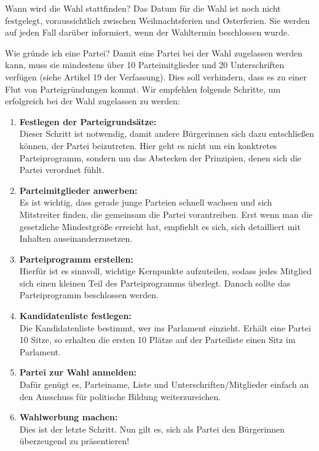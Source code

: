 \documentclass{sasbase}
\begin{document}
\begin{question}{Wann wird die Wahl stattfinden?}
	Das Datum f\"{u}r die Wahl ist noch nicht festgelegt, voraussichtlich zwischen Weihnachtsferien und Osterferien. Sie werden auf jeden Fall dar\"{u}ber informiert, wenn der Wahltermin beschlossen wurde.
\end{question}
\begin{question}{Wie gr\"{u}nde ich eine Partei?}
	Damit eine Partei bei der Wahl zugelassen werden kann, muss sie mindestens \"{u}ber 10 Parteimitglieder und 20 Unterschriften verf\"{u}gen (siehe Artikel 19 der Verfassung). Dies soll verhindern, dass es zu einer Flut von Parteigr\"{u}ndungen kommt. Wir empfehlen folgende Schritte, um erfolgreich bei der Wahl zugelassen zu werden:
	\begin{enumerate}
		\item \textbf{Festlegen der Parteigrunds\"{a}tze:}\\ Dieser Schritt ist notwendig, damit andere B\"{u}rgerinnen sich dazu entschlie{\ss}en k\"{o}nnen, der Partei beizutreten. Hier geht es nicht um ein konktretes Parteiprogramm, sondern um das Abstecken der Prinzipien, denen sich die Partei verordnet f\"{u}hlt.
		\item \textbf{Parteimitglieder anwerben:}\\ Es ist wichtig, dass gerade junge Parteien schnell wachsen und sich Mitstreiter finden, die gemeinsam die Partei vorantreiben. Erst wenn man die gesetzliche Mindestgr\"{o}{\ss}e erreicht hat, empfiehlt es sich, sich detailliert mit Inhalten auseinanderzusetzen.
		\item \textbf{Parteiprogramm erstellen:}\\ Hierf\"{u}r ist es sinnvoll, wichtige Kernpunkte aufzuteilen, sodass jedes Mitglied sich einen kleinen Teil des Parteiprogramms \"{u}berlegt. Danach sollte das Parteiprogramm beschlossen werden.
		\item \textbf{Kandidatenliste festlegen:}\\ Die Kandidatenliste bestimmt, wer ins Parlament einzieht. Erh\"{a}lt eine Partei 10 Sitze, so erhalten die ersten 10 Pl\"{a}tze auf der Parteiliste einen Sitz im Parlament.
		\item \textbf{Partei zur Wahl anmelden:}\\ Daf\"{u}r gen\"{u}gt es, Parteiname, Liste und Unterschriften/Mitglieder einfach an den Ausschuss f\"{u}r politische Bildung weiterzureichen.
		\item \textbf{Wahlwerbung machen:}\\ Dies ist der letzte Schritt. Nun gilt es, sich als Partei den B\"{u}rgerinnen \"{u}berzeugend zu pr\"{a}sentieren!
	\end{enumerate}
\end{question}
\end{document}
